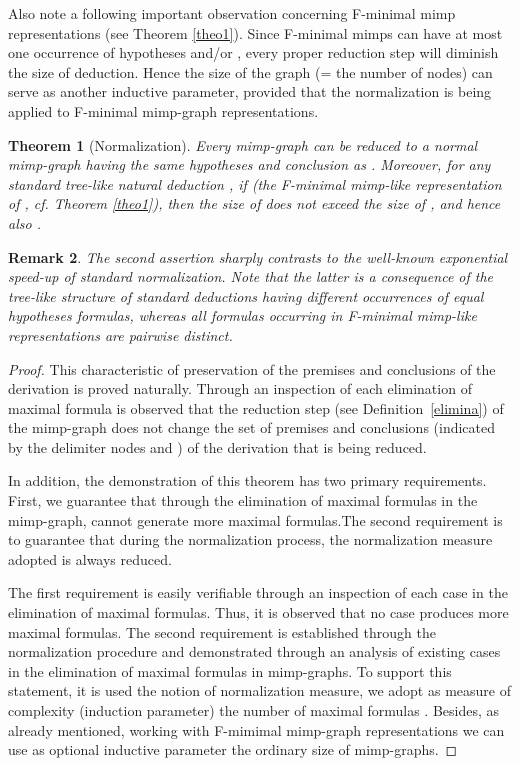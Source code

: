 \documentclass[submission,copyright,creativecommons]{eptcs}
\newtheorem{theorem}{Theorem}
\newtheorem{remark}[theorem]{Remark}
\begin{document}
Also note a following important observation concerning F-minimal mimp
representations (see Theorem \ref{theo1}). Since F-minimal mimps can have at most one
occurrence of hypotheses  and/or , every proper reduction
step will diminish the size of deduction. Hence the size of the graph (= the
number of nodes) can serve as another inductive parameter, provided that the
normalization is being applied to F-minimal mimp-graph representations.


\begin{theorem}[Normalization]\label{theo2}
Every mimp-graph  can be reduced to a normal mimp-graph 
having the same hypotheses and conclusion as . Moreover, for any standard
tree-like natural deduction , if  (the F-minimal
mimp-like representation of , cf. Theorem \ref{theo1}), then the size of  does not exceed the size of , and hence also .
\end{theorem}

\begin{remark}
The second assertion sharply contrasts to the well-known exponential speed-up of
standard normalization. Note that the latter is a consequence of the
tree-like structure of standard deductions having different occurrences of
equal hypotheses formulas, whereas all formulas occurring in F-minimal
mimp-like representations are pairwise distinct.
\end{remark}

\begin{proof}
This characteristic of preservation of the premises and conclusions of the 
derivation is proved naturally. Through an inspection of each elimination 
of maximal formula is observed that the reduction step (see Definition~\ref{elimina}) 
of the mimp-graph does not change the set of premises and conclusions 
(indicated by the delimiter nodes  and ) of the derivation that is being reduced.

In addition, the demonstration of this theorem has two primary requirements. 
First, we guarantee that through the elimination of maximal formulas in the 
mimp-graph, cannot generate more maximal formulas.The second requirement is to guarantee that during the normalization process, 
the normalization measure adopted is always reduced. 

The first requirement is easily verifiable through an inspection of each case 
in the elimination of maximal formulas. Thus, it is observed that no case 
produces more maximal formulas. The second requirement is established through 
the normalization procedure and demonstrated through an analysis of existing 
cases in the elimination of maximal formulas in mimp-graphs. To support this 
statement, it is used the notion of normalization measure, we adopt as measure 
of complexity (induction parameter) the number of maximal formulas . 
Besides, as already mentioned, working with F-mimimal mimp-graph representations we 
can use as optional inductive parameter the ordinary size of mimp-graphs.   
\end{proof}
\end{document}
